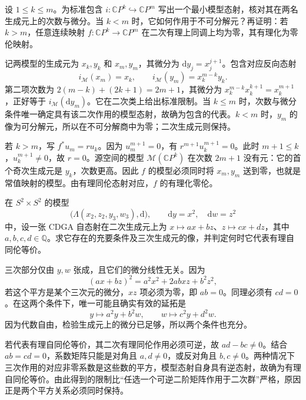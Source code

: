 \begin{exercise}\label{g2:ex:projective-inclusion-model}
	设 \(1\leq k\leq m\)。为标准包含 \(i:\mathbb CP^k\hookrightarrow\mathbb CP^m\) 写出一个最小模型态射，核对其在两名生成元上的次数与微分。当 \(k<m\) 时，它如何作用于不可分解元？再证明：若 \(k>m\)，任意连续映射 \(f:\mathbb CP^k\to\mathbb CP^m\) 在二次有理上同调上均为零，其有理化为零伦映射。
\end{exercise}
\begin{solution}
	记两模型的生成元为 \(x_k,y_k\) 和 \(x_m,y_m\)，其微分为 \(\mathrm dy_j=x_j^{j+1}\)。包含对应反向态射
	\[
		i_{\mathcal M}(x_m)=x_k,\qquad
		i_{\mathcal M}(y_m)=x_k^{m-k}y_k.
	\]
	第二项次数为 \(2(m-k)+(2k+1)=2m+1\)，其微分为 \(x_k^{m-k}x_k^{k+1}=x_k^{m+1}\)，正好等于 \(i_{\mathcal M}(\mathrm dy_m)\)。它在二次类上给出标准限制。当 \(k\leq m\) 时，次数与微分条件唯一确定具有该二次作用的模型态射，故确为包含的代表。\(k<m\) 时，\(y_m\) 的像为可分解元，所以在不可分解商中为零；二次生成元则保持。

	若 \(k>m\)，写 \(f^*u_m=r u_k\)。因为 \(u_m^{m+1}=0\)，有 \(r^{m+1}u_k^{m+1}=0\)。此时 \(m+1\leq k\)，\(u_k^{m+1}\ne0\)，故 \(r=0\)。源空间的模型 \(\mathcal M(\mathbb CP^k)\) 在次数 \(2m+1\) 没有元：它的首个奇次生成元是 \(y_k\)，次数更高。因此 \(f\) 的模型必须同时将 \(x_m,y_m\) 送到零，也就是常值映射的模型。由有理同伦态射对应，\(f\) 的有理化零伦。
\end{solution}

\begin{exercise}\label{g2:ex:two-sphere-product-model-maps}
	在 \(S^2\times S^2\) 的模型
	\[
		\bigl(\Lambda(x_2,z_2,y_3,w_3),\mathrm d\bigr),\qquad
		\mathrm dy=x^2,\quad\mathrm dw=z^2
	\]
	中，设一张 CDGA 自态射在二次生成元上为 \(x\mapsto ax+bz\)、\(z\mapsto cx+dz\)，其中 \(a,b,c,d\in\mathbb Q\)。求它存在的充要条件及三次生成元的像，并判定何时它代表有理自同伦等价。
\end{exercise}
\begin{solution}
	三次部分仅由 \(y,w\) 张成，且它们的微分线性无关。因为
	\[
		(ax+bz)^2=a^2x^2+2abxz+b^2z^2,
	\]
	若这个平方是某个三次元的微分，\(xz\) 项必须为零，即 \(ab=0\)。同理必须有 \(cd=0\)。在这两个条件下，唯一可能且确实有效的延拓是
	\[
		y\longmapsto a^2y+b^2w,\qquad
		w\longmapsto c^2y+d^2w.
	\]
	因为代数自由，检验生成元上的微分已足够，所以两个条件也充分。

	若代表有理自同伦等价，其二次有理同伦作用必须可逆，故 \(ad-bc\ne0\)。结合 \(ab=cd=0\)，系数矩阵只能是对角且 \(a,d\ne0\)，或反对角且 \(b,c\ne0\)。两种情况下三次作用的对应非零系数是这些数的平方，模型态射自身具有逆态射，故确为有理自同伦等价。由此得到的限制比“任选一个可逆二阶矩阵作用于二次群”严格，原因正是两个平方关系必须同时保持。
\end{solution}

